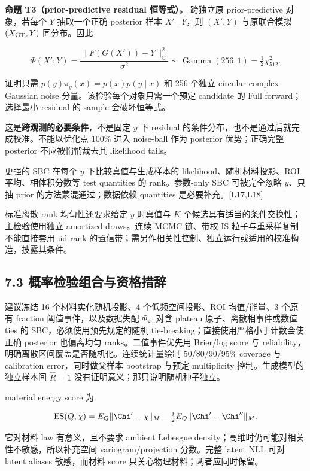 \documentclass[
  11pt,
  a4paper,
]{article}
\begin{document}
\textbf{命题 T3（prior-predictive residual 恒等式）。} 跨独立原
prior-predictive 对象，若每个 \(Y\) 抽取一个正确 posterior 样本
\(X'\mid Y\)，则 \((X',Y)\) 与原联合模拟 \((X_{\rm GT},Y)\) 同分布。因此

\[\Phi(X';Y)=\frac{\|F(G(X'))-Y\|_{\mathbb{C}}^2}{\sigma^2}
\sim\operatorname{Gamma}(256,1)=\tfrac12\chi^2_{512}.\]

证明只需 \(p(y)\pi_y(x)=p(x)p(y\mid x)\) 和 256 个独立 circular-complex
Gaussian noise 分量。该检验每个对象只需一个预定 candidate 的 Full
forward；选择最小 residual 的 sample 会破坏恒等式。

这是\textbf{跨观测的必要条件}，不是固定 \(y\) 下 residual
的条件分布，也不是通过后就完成校准。不能以优化点 100\% 进入 noise-ball
作为 posterior 优势；正确完整 posterior 不应被悄悄裁去其 likelihood
tails。

更强的 SBC 在每个 \(y\) 下比较真值与生成样本的
likelihood、随机材料投影、ROI 平均、相体积分数等 test quantities 的
rank。参数-only SBC 可被完全忽略 \(y\)、只抽 prior
的方法蒙混通过；数据依赖 quantities 是必要补充。{[}L17,L18{]}

标准离散 rank 均匀性还要求给定 \(y\) 时真值与 \(K\)
个候选具有适当的条件交换性；主检验使用独立 amortized draws。连续 MCMC
链、带权 IS 粒子与重采样复制不能直接套用 iid rank
的置信带；需另作相关性控制、独立运行或适用的校准构造，披露其条件。

\hypertarget{ux6982ux7387ux68c0ux9a8cux7ec4ux5408ux4e0eux8d44ux683cux63aaux8f9e}{%
\subsection{7.3
概率检验组合与资格措辞}\label{ux6982ux7387ux68c0ux9a8cux7ec4ux5408ux4e0eux8d44ux683cux63aaux8f9e}}

建议冻结 16 个材料实化随机投影、4 个低频空间投影、ROI 均值/能量、3
个原有 fraction 阈值事件，以及数据失配 \(\Phi\)。对含 plateau
原子、离散相事件或数值 ties 的 SBC，必须使用预先规定的随机
tie-breaking；直接使用严格小于计数会使正确 posterior 也偏离均匀
ranks。二值事件优先用 Brier/log score 与
reliability，明确离散区间覆盖是否随机化。连续统计量绘制 50/80/90/95\%
coverage 与 calibration error，同时做父样本 bootstrap 与预定
multiplicity 控制。生成模型的独立样本间 \(\widehat R=1\)
没有证明意义；那只说明随机种子独立。

material energy score 为

\[\mathrm{ES}(Q,\chi)=E_Q\|\Chi'-\chi\|_M-\tfrac12E_Q\|\Chi'-\Chi''\|_M.\]

它对材料 law 有意义，且不要求 ambient Lebesgue
density；高维时仍可能对相关性不敏感，所以补充空间 variogram/projection
分数。完整 latent NLL 可对 latent aliases 敏感，而材料 score
只关心物理材料；两者应同时保留。
\end{document}

